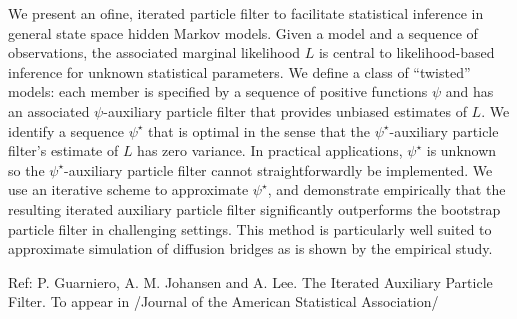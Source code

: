 We present an ofine, iterated particle filter to facilitate statistical
inference in general state space hidden Markov models. Given a
model and a sequence of observations, the associated marginal
likelihood $L$ is central to likelihood-based inference for unknown
statistical parameters. We define a class of ``twisted'' models: each
member is specified by a sequence of positive functions $\psi$ and
has an associated $\psi$-auxiliary particle filter that provides
unbiased estimates of $L$. We identify a sequence $\psi^\star$ that is
optimal in the
sense that the $\psi^\star$-auxiliary particle filter's estimate of $L$ has
zero variance. In practical applications, $\psi^\star$ is unknown so the $\psi^\star$-auxiliary particle filter cannot straightforwardly be
implemented. We use an iterative scheme to approximate $\psi^\star$, and
demonstrate empirically that the resulting iterated auxiliary particle
filter significantly outperforms the bootstrap particle filter in
challenging settings. This method is particularly well suited to
approximate simulation of diffusion bridges as is shown by the
empirical study.

\noindent Ref: P. Guarniero, A. M. Johansen and A. Lee. The Iterated Auxiliary
Particle Filter. To appear in /Journal of the American Statistical
Association/ 

